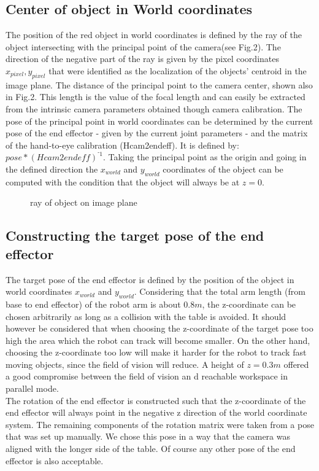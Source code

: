 \documentclass[letterpaper, 10 pt, conference]{IEEEconf}  %
\begin{document}
\subsection{Center of object in World coordinates}

The position of the red object in world coordinates is defined by the ray of the object intersecting with the principal point of the camera(see Fig.2). The direction of the negative part of the ray is given by the pixel coordinates $x_{pixel},y_{pixel}$ that were identified as the localization of the objects' centroid in the image plane. The distance of the principal point to the camera center, shown also in Fig.2. This length is the value of the focal length and can easily be extracted from the intrinsic camera parameters obtained though camera calibration. The pose of the principal point in world coordinates can be determined by the current pose of the end effector - given by the current joint parameters - and the matrix of the hand-to-eye calibration (Hcam2endeff). It is defined by: $pose*(Hcam2endeff)^{⁻1}$. Taking the principal point as the origin and going in the defined direction the $x_{world}$ and $y_{world}$ coordinates of the object can be computed with the condition that the object will always be at $z=0$.  
\begin{figure}
\caption*{\label{fig:finding target position}ray of object on image plane}
\end{figure}

\subsection{Constructing the target pose of the end effector}
The target pose of the end effector is defined by the position of the object in world coordinates $x_{world}$ and $y_{world}$. Considering that the total arm length (from base to end effector) of the robot arm  is about $0.8m$, the z-coordinate can be chosen arbitrarily as long as a collision with the table is avoided. It should however be considered that when choosing the z-coordinate of the target pose too high the area which the robot can track will become smaller. On the other hand, choosing the z-coordinate too low will make it harder for the robot to track fast moving objects, since the field of vision will reduce. A height of $z=0.3m$ offered a good compromise between the field of vision an d reachable workspace in parallel mode.\\The rotation of the end effector is constructed such that the z-coordinate of the end effector will always point in the negative z direction of the world coordinate system. The remaining components of the rotation matrix were taken from a pose that was set up manually. We chose this pose in a way that the camera was aligned with the longer side of the table. Of course any other pose of the end effector is also acceptable.
\end{document}
